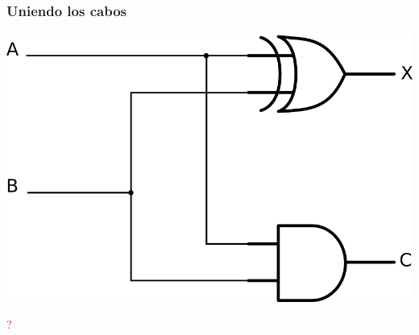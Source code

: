 \begin{frame}
    \frametitle{Uniendo los cabos}
    \includegraphics[scale=0.25]{./images/adder.png}
    \\
    \vspace{10mm}
    \begin{center}
        \huge{\textcolor{red}{?}}
    \end{center}

\end{frame}

